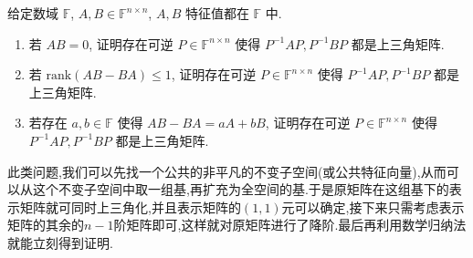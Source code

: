 \documentclass[../../main.tex]{subfiles}
\begin{document}
\begin{proposition}\label{proposition:两个矩阵可同时上三角化的条件}
给定数域 \( \mathbb{F} \), \( A, B \in \mathbb{F}^{n \times n} \), \( A, B \) 特征值都在 \( \mathbb{F} \) 中.
\begin{enumerate}
\item 若 \( AB = 0 \), 证明存在可逆 \( P \in \mathbb{F}^{n \times n} \) 使得 \( P^{-1}AP, P^{-1}BP \) 都是上三角矩阵.

\item 若 \( \mathrm{rank}(AB - BA) \leqslant 1 \), 证明存在可逆 \( P \in \mathbb{F}^{n \times n} \) 使得 \( P^{-1}AP, P^{-1}BP \) 都是上三角矩阵.

\item 若存在 \( a, b \in \mathbb{F} \) 使得 \( AB - BA = aA + bB \), 证明存在可逆 \( P \in \mathbb{F}^{n \times n} \) 使得 \( P^{-1}AP, P^{-1}BP \) 都是上三角矩阵.
\end{enumerate}
\end{proposition}
\begin{note}
此类问题,我们可以先找一个公共的非平凡的不变子空间(或公共特征向量),从而可以从这个不变子空间中取一组基,再扩充为全空间的基.于是原矩阵在这组基下的表示矩阵就可同时上三角化,并且表示矩阵的$(1,1)$元可以确定,接下来只需考虑表示矩阵的其余的$n-1$阶矩阵即可,这样就对原矩阵进行了降阶.最后再利用数学归纳法就能立刻得到证明.
\end{note}
\end{document}
